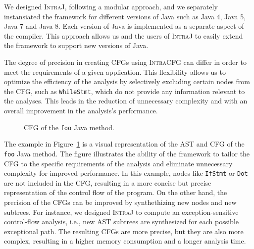 We designed \textsc{IntraJ}, following a  modular approach, and we separately
instansiated the framework for different versions of Java such as Java 4,
Java 5, Java 7 and Java 8. Each version of Java is implemented as a separate
aspect of the compiler. This approach allows us and the users of \textsc{IntraJ}
to easily extend the framework to support new versions of Java.

The degree of precision in creating CFGs using \textsc{IntraCFG} can differ in order
to meet the requirements of a given application.
This flexibility allows us to optimize the efficiency of the analysis by selectively
excluding certain nodes from the CFG, such as \texttt{WhileStmt}, which do not
provide any information relevant to the analyses. This leads in the reduction of
unnecessary complexity and with an overall improvement in the analysis's performance.
\begin{figure}[H]
	\centering
	\caption{\label{fig:CFG} CFG of the \texttt{foo} Java method.}
\end{figure}

The example in Figure~\ref{fig:CFG} is a visual representation of the AST and CFG of the
\texttt{foo} Java method. The figure illustrates the ability of the framework to tailor the CFG
to the specific requirements of the analysis and eliminate unnecessary complexity for improved performance.
In this example, nodes like \texttt{IfStmt} or \texttt{Dot} are not included in the CFG,
resulting in a more concise but precise representation of the control flow of the program.
On the other hand, the precision of the CFGs can be improved by synthethizing new nodes and new subtrees.
For instance, we designed \textsc{IntraJ} to compute an exception-sensitive
control-flow analysis, i.e., new AST subtrees are synthesized for each possible exceptional path.
The resulting CFGs are more precise, but they are also more complex, resulting
in a higher memory consumption and a longer analysis time.



